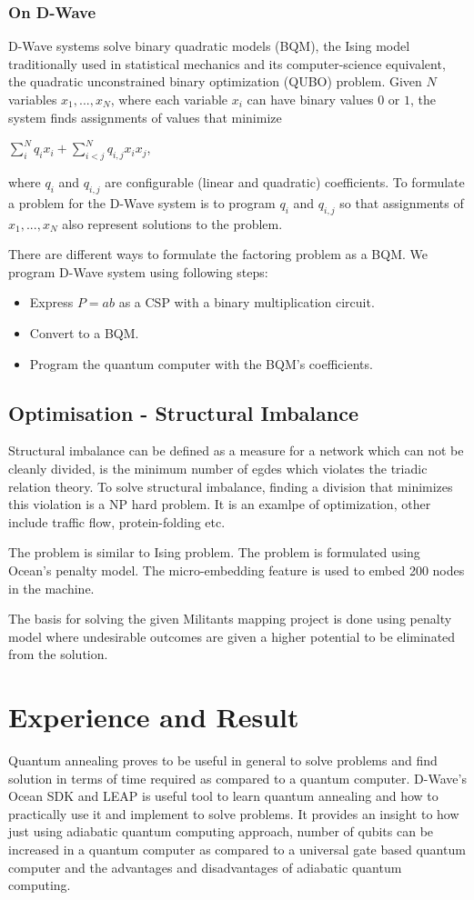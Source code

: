 \documentclass[12pt,conference]{IEEEtran}
\begin{document}
\subsubsection{On D-Wave}
D-Wave systems solve binary quadratic models (BQM), the Ising model traditionally used in statistical mechanics and its computer-science equivalent, the quadratic unconstrained binary optimization (QUBO) problem. Given $N$ variables $x_1,...,x_N$, where each variable $x_i$ can have binary values $0$ or $1$, the system finds assignments of values that minimize \cite{6}

$\sum_i^N q_ix_i + \sum_{i<j}^N q_{i,j}x_i  x_j$,

where $q_i$ and $q_{i,j}$ are configurable (linear and quadratic) coefficients. To formulate a problem for the D-Wave system is to program $q_i$ and $q_{i,j}$ so that assignments of $x_1,...,x_N$ also represent solutions to the problem.

There are different ways to formulate the factoring problem as a BQM. We program D-Wave system using following steps:

\begin{itemize}
  \item Express $P=ab$ as a CSP with a binary multiplication circuit.
  \item Convert to a BQM.
  \item Program the quantum computer with the BQM's coefficients.
\end{itemize}


\subsection{Optimisation - Structural Imbalance}
Structural imbalance can be defined as a measure for a network which can not be cleanly divided, is the minimum number of egdes which violates the triadic relation theory. 
To solve structural imbalance, finding a division that minimizes this violation is a NP hard problem. It is an examlpe of optimization, other include traffic flow, protein-folding etc.

The problem is similar to Ising problem. The problem is formulated using Ocean's penalty model. The micro-embedding feature is used to embed 200 nodes in the machine.

The basis for solving the given Militants mapping project is done using penalty model where undesirable outcomes are given a higher potential to be eliminated from the solution. 


\section{Experience and Result}
Quantum annealing proves to be useful in general to solve problems and find solution in terms of time required as compared to a quantum computer. D-Wave's Ocean SDK and LEAP is useful tool to learn quantum annealing and how to practically use it and implement to solve problems. It provides an insight to how just using adiabatic quantum computing approach, number of qubits can be increased in a quantum computer as compared to a universal gate based quantum computer and the advantages and disadvantages of adiabatic quantum computing. 
\end{document}
